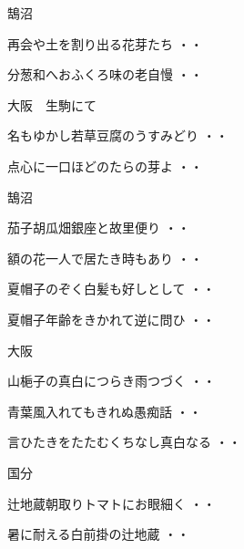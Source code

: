 \vspace{0.6cm}
鵠沼
\begin{shiika}再会や土を割り出る花芽たち
\hfill{・・}\end{shiika}
\begin{shiika}分葱和へおふくろ味の老自慢
\hfill{・・}\end{shiika}
\vspace{0.6cm}
大阪　生駒にて
\begin{shiika}名もゆかし若草豆腐のうすみどり
\hfill{・・}\end{shiika}
\begin{shiika}点心に一口ほどのたらの芽よ
\hfill{・・}\end{shiika}
\vspace{0.6cm}
鵠沼
\begin{shiika}茄子胡瓜畑銀座と故里便り
\hfill{・・}\end{shiika}
\begin{shiika}額の花一人で居たき時もあり
\hfill{・・}\end{shiika}
\begin{shiika}夏帽子のぞく白髪も好しとして
\hfill{・・}\end{shiika}
\begin{shiika}夏帽子年齢をきかれて逆に問ひ
\hfill{・・}\end{shiika}
\vspace{0.6cm}
大阪
\begin{shiika}山梔子の真白につらき雨つづく
\hfill{・・}\end{shiika}
\begin{shiika}青葉風入れてもきれぬ愚痴話
\hfill{・・}\end{shiika}
\begin{shiika}言ひたきをたたむくちなし真白なる
\hfill{・・}\end{shiika}
\vspace{0.6cm}
国分
\begin{shiika}辻地蔵朝取りトマトにお眼細く
\hfill{・・}\end{shiika}
\vspace{0.6cm}
\begin{shiika}暑に耐える白前掛の辻地蔵
\hfill{・・}\end{shiika}
